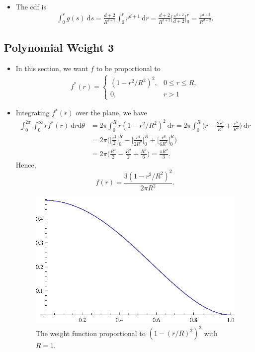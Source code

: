 \documentclass[10pt]{article}
\newcommand{\dee}{\mathrm{d}}
\begin{document}
\begin{itemize}
	\item The cdf is
		\begin{align*}
			\int_0^r g(s)\ \dee s = \frac{d+2}{R^{d+2}} \int_0^r r^{d+1} \ \dee r =  \frac{d+2}{R^{d+2}} \bigg[ \frac{s^{d+2}}{d+2} \bigg]_0^r
			= \frac{r^{d+2}}{R^{d+2}}.
		\end{align*}
\end{itemize}

\subsection{Polynomial Weight 3}
\begin{itemize}
	\item In this section, we want $f$ to be proportional to
		\begin{align*}
			f^*(r) = \begin{cases}
				(1 - r^2/R^2)^2, & 0 \leq r \leq R, \\
				0, & r > 1
			\end{cases}
		\end{align*}
	\item Integrating $f^*(r)$ over the plane, we have
		\begin{align*}
			\int_0^{2\pi} \int_0^\infty r f^*(r)\ \dee r \dee \theta
			&= 2\pi \int_0^R r (1-r^2/R^2)^2\ \dee r
			= 2\pi \int_0^R \bigg( r - \frac{2r^3}{R^2} + \frac{r^5}{R^4} \bigg)\ \dee r\\
			&= 2\pi \bigg( \bigg[ \frac{r^2}{2} \bigg]_0^R 
				- \bigg[ \frac{r^4}{2R^2} \bigg]_0^R 
				+ \bigg[ \frac{r^6}{6R^4} \bigg]_0^R \bigg)\\
			&= 2\pi \bigg( \frac{R^2}{2} - \frac{R^2}{2} + \frac{R^2}{6} \bigg)
			= \frac{\pi R^2}{3}.			
		\end{align*}
		Hence, $$f(r) = \frac{3(1 - r^2/R^2)^2}{2\pi R^2}.$$

		\begin{figure}[h]
			\centering
			\includegraphics{one-minus-square-squared.eps}
			\caption{The weight function proportional to $(1 - (r/R)^2)^2$ with $R = 1$.}
		\end{figure}
	

\end{itemize}
\end{document}
